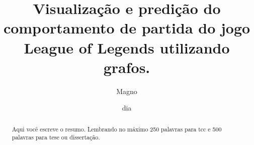\documentclass[tg]{mdtufsm}
\title{Visualização e predição do comportamento de partida do jogo League of Legends utilizando grafos. }
\author{Magno}{Guilherme}
\institute{???????Centro de Tecnologia}
\date{dia}{mês}{2018}
\begin{document}
	
	

\maketitle

\restoregeometry

	
\makeapprove




\begin{abstract}
		
Aqui você escreve o resumo. Lembrando no máximo 250 palavras para tcc e 500 palavras para tese ou dissertação.

\end{abstract}
\end{document}
